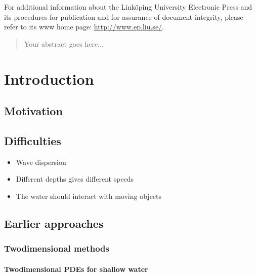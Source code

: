 \documentclass[]{report}
\begin{document}
For additional information about the Linköping University Electronic Press and its procedures for publication and for assurance of document integrity, please refer to its www home page: \url{http://www.ep.liu.se/}.


\begin{abstract}
    Your abstract goes here...
\end{abstract}

\tableofcontents
\listoftables
\listoffigures


\part{Introduction}

\chapter{Motivation}

\chapter{Difficulties}

\begin{itemize}
    \item Wave dispersion
    \item Different depths gives different speeds
    \item The water should interact with moving objects
\end{itemize}

\chapter{Earlier approaches}

\section{Twodimensional methods}

\subsection{Twodimensional PDEs for shallow water}
\end{document}
